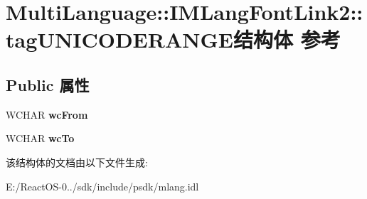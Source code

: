 \hypertarget{struct_multi_language_1_1_i_m_lang_font_link2_1_1tag_u_n_i_c_o_d_e_r_a_n_g_e}{}\section{Multi\+Language\+:\+:I\+M\+Lang\+Font\+Link2\+:\+:tag\+U\+N\+I\+C\+O\+D\+E\+R\+A\+N\+G\+E结构体 参考}
\label{struct_multi_language_1_1_i_m_lang_font_link2_1_1tag_u_n_i_c_o_d_e_r_a_n_g_e}
\subsection*{Public 属性}
\begin{DoxyCompactItemize}
\item 
\mbox{\label{struct_multi_language_1_1_i_m_lang_font_link2_1_1tag_u_n_i_c_o_d_e_r_a_n_g_e_a97339451dc5496222be4a7791b25c444}} 
W\+C\+H\+AR {\bfseries wc\+From}
\item 
\mbox{\label{struct_multi_language_1_1_i_m_lang_font_link2_1_1tag_u_n_i_c_o_d_e_r_a_n_g_e_aa1e969affcf4d1205c9883d0db5b6850}} 
W\+C\+H\+AR {\bfseries wc\+To}
\end{DoxyCompactItemize}


该结构体的文档由以下文件生成\+:\begin{DoxyCompactItemize}
\item 
E\+:/\+React\+O\+S-\/0../sdk/include/psdk/mlang.\+idl\end{DoxyCompactItemize}
